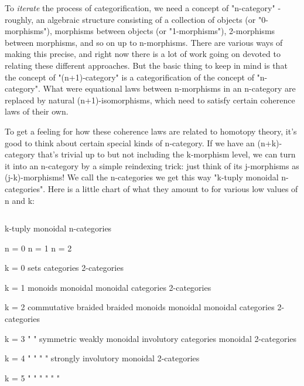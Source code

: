 {To \emph{iterate} the process of categorification, we need a concept of
"n-category" - roughly, an algebraic structure consisting of a
collection of objects (or "0-morphisms"), morphisms between objects
(or "1-morphisms"), 2-morphisms between morphisms, and so on up to
n-morphisms.  There are various ways of making this precise, and right
now there is a lot of work going on devoted to relating these
different approaches.  But the basic thing to keep in mind is that
the concept of "(n+1)-category" is a categorification of the concept
of "n-category".  
What were equational laws between n-morphisms in
an n-category are replaced by natural (n+1)-isomorphisms, which need
to satisfy certain coherence laws of their own.

To get a feeling for how these coherence laws are related to homotopy
theory, it's good to think about certain special kinds of n-category.
If we have an (n+k)-category that's trivial up to but not including
the k-morphism level, we can turn it into an n-category by a simple
reindexing trick: just think of its j-morphisms as (j-k)-morphisms!
We call the n-categories we get this way "k-tuply monoidal 
n-categories".  Here is a little chart of what they amount to for
various low values of n and k:


$$

                   k-tuply monoidal n-categories 

              n = 0           n = 1             n = 2

k = 0         sets          categories         2-categories
     

k = 1        monoids         monoidal           monoidal
                            categories        2-categories

k = 2       commutative      braided            braided
             monoids         monoidal           monoidal
                            categories        2-categories 

k = 3         " "           symmetric            weakly
                             monoidal          involutory
                            categories          monoidal
                                              2-categories

k = 4         " "             " "               strongly 
                                               involutory
                                                monoidal
                                              2-categories

k = 5         " "             " "                "  "

}
